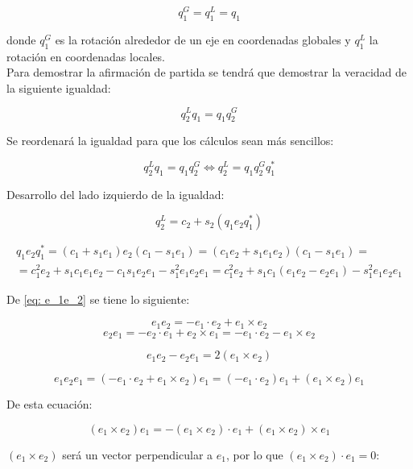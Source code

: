 \documentclass[10pt, a4paper]{report}
\begin{document}
\begin{equation}
q_1^G = q_1^L = q_1
\end{equation}

donde $q_1^G$ es la rotación alrededor de un eje en coordenadas globales y $q_1^L$ la rotación en coordenadas locales.\\

Para demostrar la afirmación de partida se tendrá que demostrar la veracidad de la siguiente igualdad:

\begin{equation}
q_2^Lq_1 = q_1q_2^G
\end{equation}

Se reordenará la igualdad para que los cálculos sean más sencillos:

\begin{equation} \label{eq: E01}
q_2^Lq_1 = q_1q_2^G \iff q_2^L = q_1q_2^Gq_1^*
\end{equation}

Desarrollo del lado izquierdo de la igualdad:

\begin{equation} \label{eq: q_2I}
q_2^L = c_2 + s_2(q_1e_2q_1^*)
\end{equation}

\begin{multline} \label{eq: q_1e_2q_1}
q_1e_2q_1^* = (c_1 + s_1e_1)e_2(c_1 - s_1e_1) = (c_1e_2 + s_1e_1e_2)(c_1 - s_1e_1) = \\
= c_1^2e_2 + s_1c_1e_1e_2 - c_1s_1e_2e_1 - s_1^2e_1e_2e_1 = c_1^2e_2 + s_1c_1(e_1e_2 - e_2e_1) - s_1^2e_1e_2e_1
\end{multline}

De \eqref{eq: e_1e_2} se tiene lo siguiente:

$$ e_1e_2 = -e_1 \cdot e_2 + e_1 \times e_2 $$
$$ e_2e_1 = -e_2 \cdot e_1 + e_2 \times e_1 = -e_1 \cdot e_2 - e_1 \times e_2 $$

\begin{equation} \label{eq: e_1e_2e_2e_1}
e_1 e_2 - e_2 e_1 = 2(e_1 \times e_2)
\end{equation}

$$ e_1 e_2 e_1 = (-e_1 \cdot e_2 + e_1 \times e_2)e_1 =(-e_1 \cdot e_2)e_1 + (e_1 \times e_2)e_1 $$

De esta ecuación:

$$ (e_1 \times e_2)e_1 = -(e_1 \times e_2) \cdot e_1 + (e_1 \times e_2) \times e_1 $$

$(e_1 \times e_2)$ será un vector perpendicular a $e_1$, por lo que $(e_1 \times e_2) \cdot e_1 = 0$:
\end{document}
